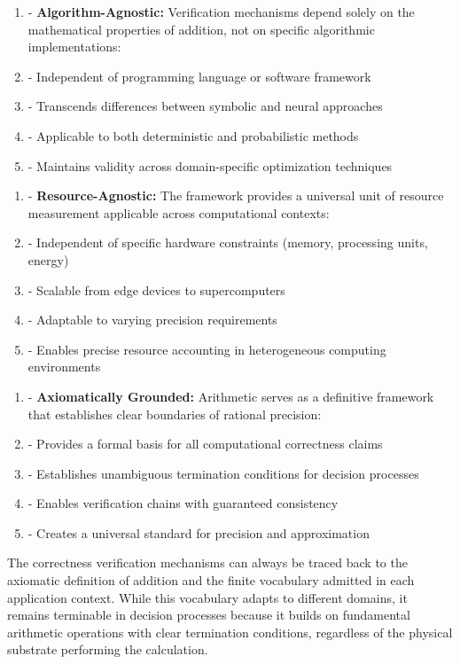 \documentclass[11pt,a4paper]{article}
\begin{document}
\begin{enumerate}
  \item - \textbf{Algorithm-Agnostic:} Verification mechanisms depend solely on the mathematical properties of addition, not on specific algorithmic implementations:
  \item - Independent of programming language or software framework
  \item - Transcends differences between symbolic and neural approaches
  \item - Applicable to both deterministic and probabilistic methods
  \item - Maintains validity across domain-specific optimization techniques
\end{enumerate}

\begin{enumerate}
  \item - \textbf{Resource-Agnostic:} The framework provides a universal unit of resource measurement applicable across computational contexts:
  \item - Independent of specific hardware constraints (memory, processing units, energy)
  \item - Scalable from edge devices to supercomputers
  \item - Adaptable to varying precision requirements
  \item - Enables precise resource accounting in heterogeneous computing environments
\end{enumerate}

\begin{enumerate}
  \item - \textbf{Axiomatically Grounded:} Arithmetic serves as a definitive framework that establishes clear boundaries of rational precision:
  \item - Provides a formal basis for all computational correctness claims
  \item - Establishes unambiguous termination conditions for decision processes
  \item - Enables verification chains with guaranteed consistency
  \item - Creates a universal standard for precision and approximation
\end{enumerate}

The correctness verification mechanisms can always be traced back to the axiomatic definition of addition and the finite vocabulary admitted in each application context. While this vocabulary adapts to different domains, it remains terminable in decision processes because it builds on fundamental arithmetic operations with clear termination conditions, regardless of the physical substrate performing the calculation.
\end{document}
